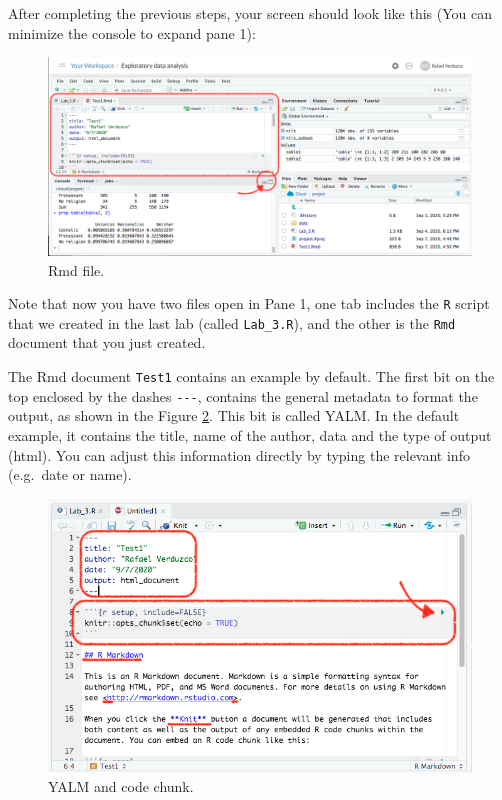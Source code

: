 \documentclass[
]{book}
\begin{document}
After completing the previous steps, your screen should look like this (You can minimize the console to expand pane 1):

\begin{figure}

\includegraphics[width=1\linewidth]{./images/lab4_rmd_view} \hfill{}

\caption{Rmd file.}\label{fig:rmd-file}
\end{figure}

Note that now you have two files open in Pane 1, one tab includes the \texttt{R} script that we created in the last lab (called \texttt{Lab\_3.R}), and the other is the \texttt{Rmd} document that you just created.

The Rmd document \texttt{Test1} contains an example by default. The first bit on the top enclosed by the dashes \texttt{-\/-\/-}, contains the general metadata to format the output, as shown in the Figure \ref{fig:yalm-chunk}. This bit is called YALM. In the default example, it contains the title, name of the author, data and the type of output (html). You can adjust this information directly by typing the relevant info (e.g.~date or name).

\begin{figure}

\includegraphics[width=1\linewidth]{./images/lab4_rmd_view_2} \hfill{}

\caption{YALM and code chunk.}\label{fig:yalm-chunk}
\end{figure}
\end{document}
